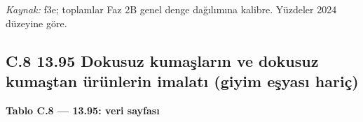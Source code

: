 \endgroup

\emph{Kaynak:} \etiketT{} f3e; toplamlar Faz 2B genel denge dağılımına kalibre. Yüzdeler 2024 düzeyine göre.

\hypertarget{nace_kartlar_13-15-c8-1395-dokusuz-kumaux15flarux131n-ve-dokusuz-kumaux15ftan-uxfcruxfcnlerin-imalatux131-giyim-eux15fyasux131-hariuxe7}{%
\subsection{C.8 13.95 Dokusuz kumaşların ve dokusuz kumaştan ürünlerin imalatı (giyim eşyası hariç)}\label{nace_kartlar_13-15-c8-1395-dokusuz-kumaux15flarux131n-ve-dokusuz-kumaux15ftan-uxfcruxfcnlerin-imalatux131-giyim-eux15fyasux131-hariuxe7}}


\textbf{Tablo C.8 --- 13.95: veri sayfası}

\nopagebreak[4]

\begingroup\gbtablo\small

